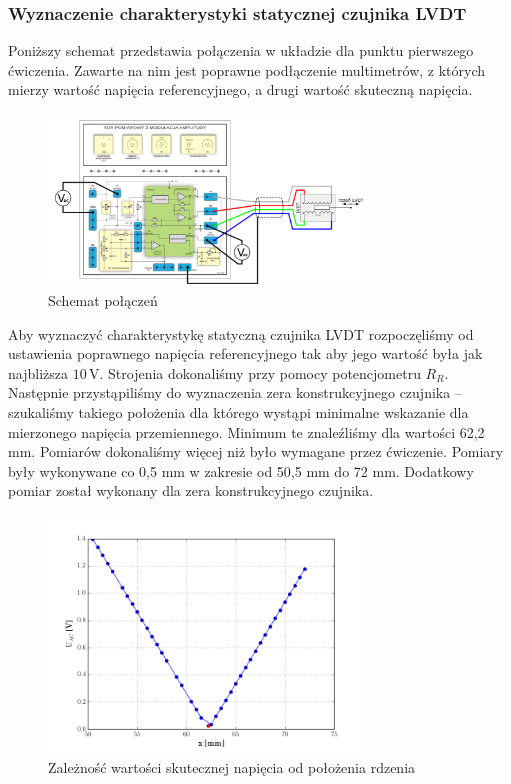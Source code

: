 \documentclass[a4paper, 12pt, titlepage]{article}
\begin{document}
			\subsubsection{Wyznaczenie charakterystyki statycznej czujnika LVDT}
				Poniższy schemat przedstawia połączenia w układzie dla punktu pierwszego ćwiczenia. Zawarte na nim jest poprawne podłączenie multimetrów, z których mierzy wartość napięcia referencyjnego, a drugi wartość skuteczną napięcia. %
				\begin{figure}[H]
					\centering
					\includegraphics[width=0.75\textwidth]{./img/tor_pierwsze.png}
					\caption{\small{Schemat połączeń}}
				\end{figure} \noindent
				Aby wyznaczyć charakterystykę statyczną czujnika LVDT rozpoczęliśmy od ustawienia poprawnego napięcia referencyjnego tak aby jego wartość była jak najbliższa $10\,\mathrm{V}$. Strojenia dokonaliśmy przy pomocy potencjometru ${R_R}$.
				\newline \newline
				Następnie przystąpiliśmy do wyznaczenia zera konstrukcyjnego czujnika -- szukaliśmy takiego położenia dla którego wystąpi minimalne wskazanie dla mierzonego napięcia przemiennego. Minimum te znaleźliśmy dla wartości 62,2 mm.
				\newline \newline
				Pomiarów dokonaliśmy więcej niż było wymagane przez ćwiczenie. Pomiary były wykonywane co 0,5 mm w zakresie od 50,5 mm do 72 mm. Dodatkowy pomiar został wykonany dla zera konstrukcyjnego czujnika.
				\begin{figure}[H]
					\centering
					\includegraphics[width=0.75\textwidth]{./img/Uac_od_x.png}
					\caption{\small{Zależność wartości skutecznej napięcia od położenia rdzenia}}
				\end{figure} \noindent
\end{document}
